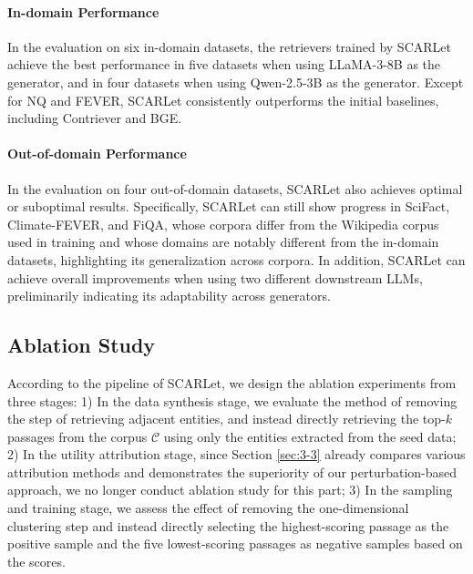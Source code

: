 \documentclass[11pt]{article}
\begin{document}
\paragraph{In-domain Performance} In the evaluation on six in-domain datasets, the retrievers trained by SCARLet achieve the best performance in five datasets when using LLaMA-3-8B as the generator, and in four datasets when using Qwen-2.5-3B as the generator. Except for NQ and FEVER, SCARLet consistently outperforms the initial baselines, including Contriever and BGE.

\paragraph{Out-of-domain Performance} In the evaluation on four out-of-domain datasets, SCARLet also achieves optimal or suboptimal results. Specifically, SCARLet can still show progress in SciFact, Climate-FEVER, and FiQA, whose corpora differ from the Wikipedia corpus used in training and whose domains are notably different from the in-domain datasets, highlighting its generalization across corpora. In addition, SCARLet can achieve overall improvements when using two different downstream LLMs, preliminarily indicating its adaptability across generators.









\subsection{Ablation Study}
\label{sec:5-2}

According to the pipeline of SCARLet, we design the ablation experiments from three stages: 1) In the data synthesis stage, we evaluate the method of removing the step of retrieving adjacent entities, and instead directly retrieving the top-$k$ passages from the corpus $\mathcal{C}$ using only the entities extracted from the seed data; 2) In the utility attribution stage, since Section \ref{sec:3-3} already compares various attribution methods and demonstrates the superiority of our perturbation-based approach, we no longer conduct ablation study for this part; 3) In the sampling and training stage, we assess the effect of removing the one-dimensional clustering step and instead directly selecting the highest-scoring passage as the positive sample and the five lowest-scoring passages as negative samples based on the scores.
\end{document}
